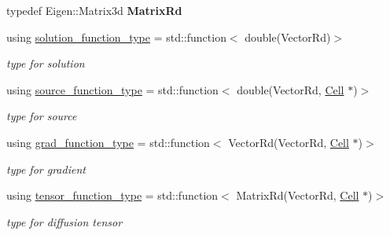 \begin{DoxyCompactItemize}
\item 
\mbox{\label{classHArDCore3D_1_1HHO__Diffusion_ae92774f15d986cd40be3aeaa758a0404}} 
typedef Eigen\+::\+Matrix3d {\bfseries Matrix\+Rd}
\item 
\mbox{\label{classHArDCore3D_1_1HHO__Diffusion_ab3104f23491ecb92d2701db651380148}} 
using \hyperlink{classHArDCore3D_1_1HHO__Diffusion_ab3104f23491ecb92d2701db651380148}{solution\+\_\+function\+\_\+type} = std\+::function$<$ double(Vector\+Rd)$>$
\begin{DoxyCompactList}\small\item\em type for solution \end{DoxyCompactList}\item 
\mbox{\label{classHArDCore3D_1_1HHO__Diffusion_a2e1e24f77c08b2edbd8d836a91f6b08b}} 
using \hyperlink{classHArDCore3D_1_1HHO__Diffusion_a2e1e24f77c08b2edbd8d836a91f6b08b}{source\+\_\+function\+\_\+type} = std\+::function$<$ double(Vector\+Rd, \hyperlink{classHArDCore3D_1_1Cell}{Cell} $\ast$)$>$
\begin{DoxyCompactList}\small\item\em type for source \end{DoxyCompactList}\item 
\mbox{\label{classHArDCore3D_1_1HHO__Diffusion_a35b1f1e3277f1d675b12d4e7533e3d23}} 
using \hyperlink{classHArDCore3D_1_1HHO__Diffusion_a35b1f1e3277f1d675b12d4e7533e3d23}{grad\+\_\+function\+\_\+type} = std\+::function$<$ Vector\+Rd(Vector\+Rd, \hyperlink{classHArDCore3D_1_1Cell}{Cell} $\ast$)$>$
\begin{DoxyCompactList}\small\item\em type for gradient \end{DoxyCompactList}\item 
\mbox{\label{classHArDCore3D_1_1HHO__Diffusion_a640287c18811b16ef9136832e99879a1}} 
using \hyperlink{classHArDCore3D_1_1HHO__Diffusion_a640287c18811b16ef9136832e99879a1}{tensor\+\_\+function\+\_\+type} = std\+::function$<$ Matrix\+Rd(Vector\+Rd, \hyperlink{classHArDCore3D_1_1Cell}{Cell} $\ast$)$>$
\begin{DoxyCompactList}\small\item\em type for diffusion tensor \end{DoxyCompactList}\end{DoxyCompactItemize}
